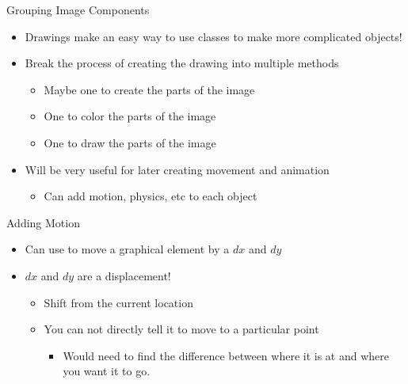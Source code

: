 \documentclass[pdf, aspectratio=169, 12pt]{beamer}
\begin{document}
\begin{frame}{Grouping Image Components}
	\begin{itemize}
		\item Drawings make an easy way to use classes to make more complicated objects!
		\item Break the process of creating the drawing into multiple methods
			\begin{itemize}
				\item Maybe one to create the parts of the image
				\item One to color the parts of the image
				\item One to draw the parts of the image
			\end{itemize}
		\item Will be very useful for later creating movement and animation
			\begin{itemize}
				\item Can add motion, physics, etc to each object
			\end{itemize}
	\end{itemize}
\end{frame}

\begin{frame}{Adding Motion}
	\begin{itemize}
		\item Can use  to move a graphical element by a $dx$ and $dy$
		\item $dx$ and $dy$ are a displacement!
			\begin{itemize}
				\item Shift from the current location
				\item You can not directly tell it to move to a particular point
					\begin{itemize}
						\item Would need to find the difference between where it is at and where you want it to go.
					\end{itemize}
			\end{itemize}
	\end{itemize}
\end{frame}
\end{document}
